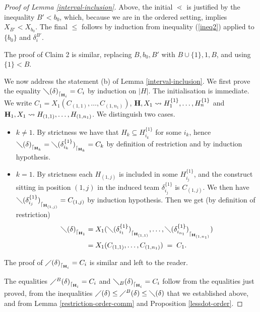 \documentclass{article}
\theoremstyle{plain}
\theoremstyle{definition}
\newcommand{\set}[1]{\{#1\}}
\newcommand{\hyper}[1]{{\bf #1}}
\newcommand{\restrconstr}[2]{{#1}_{\lceil_{#2}}}
\begin{document}
\begin{proof} [Proof of Lemma \ref{interval-inclusion}]
 Above, the initial $\lessdot$ is justified by the inequality $B'<b_0$, which, because we are in the ordered setting, implies $X_{B'}<X_{b_0}$. The final $\leq$ follows by induction from inequality (\ref{ineq2}) applied to $\set{b_0}$ and $\delta^{B'}_i$.
 
 The proof of Claim 2 is similar, replacing $B,b_0,B'$ with $B\cup\set{1},1,B$, and using $\set{1} < B$. 

\medskip
We now address the statement (b) of Lemma \ref{interval-inclusion}. We first prove the equality $\restrconstr{\diagdown(\delta)}{{\bf H}_i}=C_i$ by induction on $|H|$. The initialisation is immediate.
We write $C_1=X_1(C_{(1,1)},\ldots,C_{(1,n_1)})$, {$\hyper{H}, X_1 \leadsto H_1^{\set{1}}, \ldots , H_n^{\set{1}}$ and $\hyper{H}_1, X_1 \leadsto H_{(1,1)}, \ldots ,H_{(1,n_1)}$}. 
We distinguish two cases.
\begin{itemize}
\item $k\neq 1$.
By strictness we have that $H_k\subseteq H_{i_k}^{\set{1}}$ for some $i_k$, hence $\restrconstr{\diagdown(\delta)}{{\bf H}_k}=\restrconstr{\diagdown(\delta_{i_k}^{\{1\}})}{{\bf H}_k}=C_k$ by definition of restriction and by induction hypothesis. 
\item $k=1$. By strictness each $H_{(1,j)}$ is included in some $H_{i_j}^{\{1\}}$, and the construct
sitting in position $(1,j)$ in the induced team $\delta_{i_j}^{\set{1}}$ is $C_{(1,j)}$. We then have $\restrconstr{\diagdown(\delta_{i_j}^{\{1\}})}{{\bf H}_{(1,j)}}=C_{(1,j)}$ by induction hypothesis.
Then we get (by definition of restriction)
\begin{align*}
\restrconstr{\diagdown(\delta)}{{\bf H}_1} & = X_1(\restrconstr{\diagdown(\delta_{i_1}^{\set{1}})}{{\bf H}_{(1,1)}},\ldots,
 \restrconstr{\diagdown(\delta_{i_{n_1}}^{\set{1}})}{{\bf H}_{(1,n_1)}})\\
& = X_1(C_{(1,1)},\ldots,C_{(1,n_1)}) \; = \; C_1. 
\end{align*}
\end{itemize}
 
The proof of 
$\restrconstr{\diagup(\delta)}{{\bf H}_i}=C_i$ is similar and left to the reader.


\medskip
The equalities $\restrconstr{\diagup^B(\delta)}{{\bf H}_i}=C_i$ and $\restrconstr{\diagdown_B(\delta)}{{\bf H}_i}=C_i$ follow from the equalities just proved, from the inequalities $\diagup(\delta)\leq \diagup^B(\delta)\leq \diagdown(\delta)$ that we established above, and from Lemma \ref{restriction-order-comm} and Proposition \ref{lessdot-order}.
\end{proof}
\end{document}
